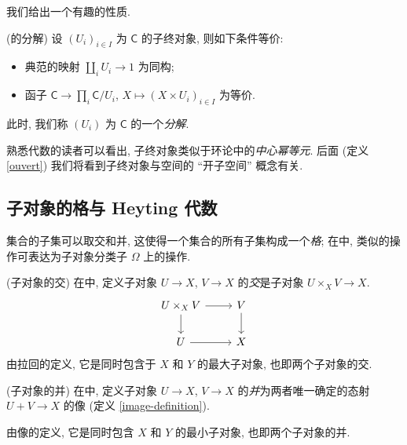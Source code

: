 我们给出一个有趣的性质.

\begin{propdef}
	{(\topos{}的分解)}
	设 $(U_i)_{i\in I}$ 为\topos{} $\mathsf C$ 的子终对象, 则如下条件等价:
	\begin{itemize}
		\item 典范的映射 $\coprod_i U_i \to 1$ 为同构;
		\item 函子 $\mathsf C \to \prod_i \mathsf C/U_i$, $X\mapsto (X\times U_i)_{i\in I}$ 为等价.
	\end{itemize}
	此时, 我们称 $(U_i)$ 为\topos{} $\mathsf C$ 的一个\emph{分解}.
\end{propdef}

\begin{remark}
	{}
	熟悉代数的读者可以看出, 子终对象类似于环论中的\emph{中心幂等元}. 后面 (定义 \ref{ouvert}) 我们将看到子终对象与空间的 ``开子空间'' 概念有关.
\end{remark}

\subsection{子对象的格与 Heyting 代数}

集合的子集可以取交和并, 这使得一个集合的所有子集构成一个\emph{格}; 在\topos{}中, 类似的操作可表达为子对象分类子 $\Omega$ 上的操作.

\begin{propdef}
	{(子对象的交)}
	在\topos{}中, 定义子对象 $U\to X$, $V\to X$ 的\emph{交}是子对象
	$U\times_X V \to X$.
	\[\begin{tikzcd}[ampersand replacement=\&]
		{U\times_X V} \& V \\
		U \& X
		\arrow[from=1-1, to=2-1]
		\arrow[from=2-1, to=2-2]
		\arrow[from=1-1, to=1-2]
		\arrow[from=1-2, to=2-2]
	\end{tikzcd}\]
	由拉回的定义, 它是同时包含于 $X$ 和 $Y$ 的最大子对象, 也即两个子对象的交.
\end{propdef}

\begin{propdef}
	{(子对象的并)}
	在\topos{}中, 定义子对象 $U\to X$, $V\to X$ 的\emph{并}为两者唯一确定的态射 $U+V\to X$ 的像 (定义 \ref{image-definition}).
	
	由像的定义, 它是同时包含 $X$ 和 $Y$ 的最小子对象, 也即两个子对象的并.
\end{propdef}

